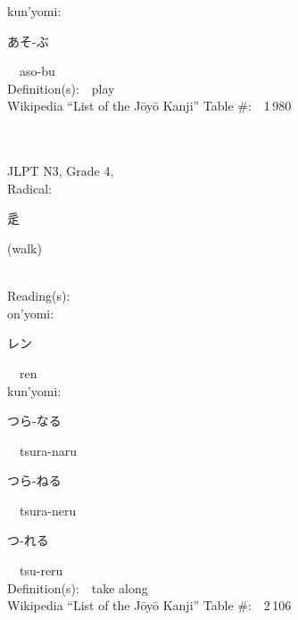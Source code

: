 \begin{multicols}{2}
{\hspace*{1em}}kun'yomi:\ \ \\
{\hspace*{2em}}{\begin{CJK}{UTF8}{min} あそ-ぶ \end{CJK}}\ \ aso-bu\ \ \\
Definition(s):\ \ play \\
Wikipedia ``List of the J\=oy\=o Kanji'' Table \#:\ \ 1\,980 \\
\ \ \\
{\fontsize{34pt}{40pt}  }\ \ \\  %
{JLPT N3, Grade 4, \\Radical:\ \ {\begin{CJK}{UTF8}{min} 辵 \end{CJK}} (walk) } \\
Reading(s):\ \ \\
{\hspace*{1em}}on'yomi:\ \ \\
{\hspace*{2em}}{\begin{CJK}{UTF8}{min} レン \end{CJK}}\ \ ren\ \ \\
{\hspace*{1em}}kun'yomi:\ \ \\
{\hspace*{2em}}{\begin{CJK}{UTF8}{min} つら-なる \end{CJK}}\ \ tsura-naru\ \ \\
{\hspace*{2em}}{\begin{CJK}{UTF8}{min} つら-ねる \end{CJK}}\ \ tsura-neru\ \ \\
{\hspace*{2em}}{\begin{CJK}{UTF8}{min} つ-れる \end{CJK}}\ \ tsu-reru\ \ \\
Definition(s):\ \ take along \\
Wikipedia ``List of the J\=oy\=o Kanji'' Table \#:\ \ 2\,106 \\
\ \ \\
\end{multicols}


